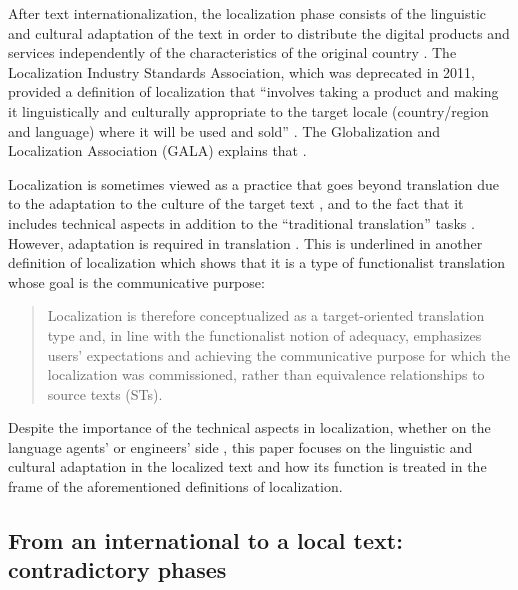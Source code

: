 \documentclass[output=paper]{langsci/langscibook}
\begin{document}
After text internationalization, the localization phase consists of the linguistic and cultural adaptation of the text in order to distribute the digital products and services independently of the characteristics of the original country \parencite{schaeler07}. The Localization Industry Standards Association, which was deprecated in 2011, provided a definition of localization that \enquote{involves taking a product and making it linguistically and culturally appropriate to the target locale (country/region and language) where it will be used and sold} \parencites[LISA 2003: 13, in][]{jimenez13}[cf.][]{yunker03}. The Globalization and Localization Association (GALA) explains that .

Localization is sometimes viewed as a practice that goes beyond translation due to the adaptation to the culture of the target text \parencite{anasch10}, and to the fact that it includes technical aspects in addition to the \enquote{traditional translation} tasks \parencite{austermuehl06}. However, adaptation is required in translation \parencite{nord05}. This is underlined in another definition of localization which shows that it is a type of functionalist translation whose goal is the communicative purpose: \blockcquote[18]{jimenez13}{Localization is therefore conceptualized as a target-oriented translation type and, in line with the functionalist notion of adequacy, emphasizes users’ expectations and achieving the communicative purpose for which the localization was commissioned, rather than equivalence relationships to source texts (STs).}

Despite the importance of the technical aspects in localization, whether on the language agents' or engineers' side \parencite[concerning localization agents, cf.][]{canim17}, this paper focuses on the linguistic and cultural adaptation in the localized text and how its function is treated in the frame of the aforementioned definitions of localization.

\subsection{From an international to a local text: contradictory phases}
\end{document}
